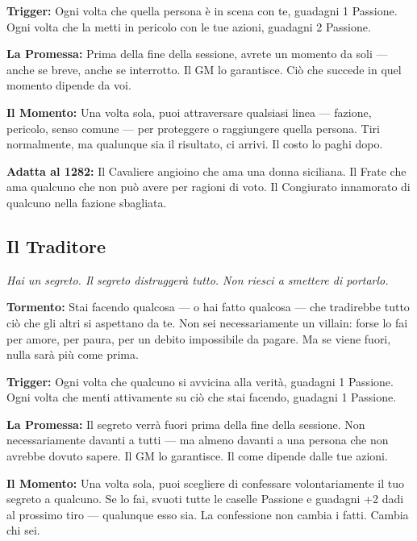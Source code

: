 \textbf{Trigger:} Ogni volta che quella persona è in scena con te,
guadagni 1 Passione. Ogni volta che la metti in pericolo con le
tue azioni, guadagni 2 Passione.

\textbf{La Promessa:} Prima della fine della sessione, avrete un
momento da soli — anche se breve, anche se interrotto. Il GM lo
garantisce. Ciò che succede in quel momento dipende da voi.

\textbf{Il Momento:} Una volta sola, puoi attraversare qualsiasi
linea — fazione, pericolo, senso comune — per proteggere o raggiungere
quella persona. Tiri normalmente, ma qualunque sia il risultato,
ci arrivi. Il costo lo paghi dopo.

\textbf{Adatta al 1282:} Il Cavaliere angioino che ama una donna
siciliana. Il Frate che ama qualcuno che non può avere per ragioni
di voto. Il Congiurato innamorato di qualcuno nella fazione sbagliata.


\filetto

\subsection{Il Traditore}
\textit{Hai un segreto. Il segreto distruggerà tutto. Non riesci a smettere di portarlo.}

\textbf{Tormento:} Stai facendo qualcosa — o hai fatto qualcosa — che
tradirebbe tutto ciò che gli altri si aspettano da te. Non sei
necessariamente un villain: forse lo fai per amore, per paura,
per un debito impossibile da pagare. Ma se viene fuori, nulla
sarà più come prima.

\textbf{Trigger:} Ogni volta che qualcuno si avvicina alla verità,
guadagni 1 Passione. Ogni volta che menti attivamente su ciò che
stai facendo, guadagni 1 Passione.

\textbf{La Promessa:} Il segreto verrà fuori prima della fine della
sessione. Non necessariamente davanti a tutti — ma almeno davanti
a una persona che non avrebbe dovuto sapere. Il GM lo garantisce.
Il come dipende dalle tue azioni.

\textbf{Il Momento:} Una volta sola, puoi scegliere di confessare
volontariamente il tuo segreto a qualcuno. Se lo fai, svuoti tutte
le caselle Passione e guadagni +2 dadi al prossimo tiro — qualunque
esso sia. La confessione non cambia i fatti. Cambia chi sei.

